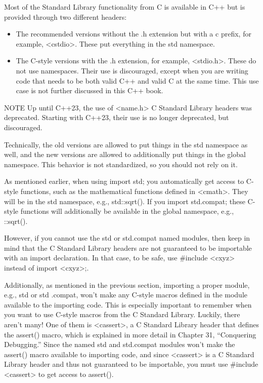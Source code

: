 Most of the Standard Library functionality from C is available in C++ but is provided through two different headers:

\begin{itemize}
\item
The recommended versions without the .h extension but with a c prefix, for example, <cstdio>. These put everything in the std namespace.

\item
The C-style versions with the .h extension, for example, <stdio.h>. These do not use namespaces. Their use is discouraged, except when you are writing code that needs to be both valid C++ and valid C at the same time. This use case is not further discussed in this C++ book.
\end{itemize}


\begin{myNotic}{NOTE}
Up until C++23, the use of <name.h> C Standard Library headers was deprecated. Starting with C++23, their use is no longer deprecated, but discouraged.
\end{myNotic}

Technically, the old versions are allowed to put things in the std namespace as well, and the new versions are allowed to additionally put things in the global namespace. This behavior is not standardized, so you should not rely on it.

As mentioned earlier, when using import std; you automatically get access to C-style functions, such as the mathematical functions defined in <cmath>. They will be in the std namespace, e.g., std::sqrt(). If you import std.compat; these C-style functions will additionally be available in the global namespace, e.g., ::sqrt().

However, if you cannot use the std or std.compat named modules, then keep in mind that the C Standard Library headers are not guaranteed to be importable with an import declaration. In that case, to be safe, use \#include <cxyz> instead of import <cxyz>;.

Additionally, as mentioned in the previous section, importing a proper module, e.g., std or std .compat, won’t make any C-style macros defined in the module available to the importing code. This is especially important to remember when you want to use C-style macros from the C Standard Library. Luckily, there aren’t many! One of them is <cassert>, a C Standard Library header that defines the assert() macro, which is explained in more detail in Chapter 31, “Conquering Debugging.” Since the named std and std.compat modules won’t make the assert() macro available to importing code, and since <cassert> is a C Standard Library header and thus not guaranteed to be importable, you must use \#include <cassert> to get access to assert().

